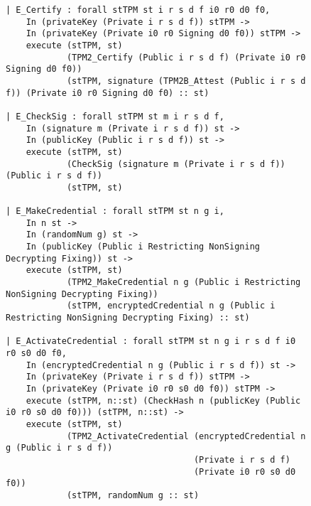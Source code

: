 \begin{figure}[h]
\begin{lstlisting}[language=Coq]           
| E_Certify : forall stTPM st i r s d f i0 r0 d0 f0,
    In (privateKey (Private i r s d f)) stTPM -> 
    In (privateKey (Private i0 r0 Signing d0 f0)) stTPM ->
    execute (stTPM, st)
            (TPM2_Certify (Public i r s d f) (Private i0 r0 Signing d0 f0))
            (stTPM, signature (TPM2B_Attest (Public i r s d f)) (Private i0 r0 Signing d0 f0) :: st)

| E_CheckSig : forall stTPM st m i r s d f,
    In (signature m (Private i r s d f)) st ->
    In (publicKey (Public i r s d f)) st ->
    execute (stTPM, st)
            (CheckSig (signature m (Private i r s d f)) (Public i r s d f))
            (stTPM, st)

| E_MakeCredential : forall stTPM st n g i,
    In n st ->
    In (randomNum g) st ->
    In (publicKey (Public i Restricting NonSigning Decrypting Fixing)) st ->
    execute (stTPM, st)
            (TPM2_MakeCredential n g (Public i Restricting NonSigning Decrypting Fixing))
            (stTPM, encryptedCredential n g (Public i Restricting NonSigning Decrypting Fixing) :: st)

| E_ActivateCredential : forall stTPM st n g i r s d f i0 r0 s0 d0 f0,
    In (encryptedCredential n g (Public i r s d f)) st ->
    In (privateKey (Private i r s d f)) stTPM ->
    In (privateKey (Private i0 r0 s0 d0 f0)) stTPM ->
    execute (stTPM, n::st) (CheckHash n (publicKey (Public i0 r0 s0 d0 f0))) (stTPM, n::st) ->
    execute (stTPM, st)
            (TPM2_ActivateCredential (encryptedCredential n g (Public i r s d f)) 
                                     (Private i r s d f)
                                     (Private i0 r0 s0 d0 f0)) 
            (stTPM, randomNum g :: st)
\end{lstlisting}
\end{figure}   
      

